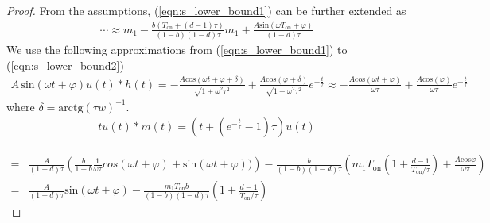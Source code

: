 \begin{proof}

From the assumptions, (\ref{eqn:s_lower_bound1}) can be further extended as
\begin{align}  \label{eqn:s_lower_bound2}
    \cdots \approx m_1 - \frac{b(T_{\text{on}} + (d-1)\tau)}{(1-b)(1-d)\tau} m_1 + \frac{A\text{sin}(\omega T_{\text{on}}+\varphi)}{(1-d)\tau}
\end{align}
We use the following approximations from (\ref{eqn:s_lower_bound1}) to (\ref{eqn:s_lower_bound2})
\begin{align}
    A \, \text{sin}(\omega  t+\varphi) u(t) * h(t) = -\frac{A \text{cos}(\omega t + \varphi + \delta)}{\sqrt{1+\omega^2\tau^2}} + \frac{A \text{cos}( \varphi + \delta)}{\sqrt{1+\omega^2\tau^2}} e^{-\frac{t}{\tau}} \approx -\frac{A \text{cos}(\omega t + \varphi)}{\omega\tau} + \frac{A \text{cos}( \varphi)}{\omega \tau} e^{-\frac{t}{\tau}}
\end{align}
where $\delta = \text{arctg}(\tau w)^{-1}$.
\begin{align}
    tu(t)*m(t) = \left(t + (e^{-\frac{t}{\tau}}-1)\tau \right) u(t)
\end{align}

\begin{align}
    =& \frac{A}{(1-d)\tau}\left( \frac{b}{1-b} \frac{1}{\omega \tau} cos(\omega t + \varphi) + \text{sin}(\omega t+\varphi))\right) -
    \frac{b}{(1-b)(1-d)\tau}\left( m_1T_{\text{on}} \left( 1 + \frac{d-1}{T_{\text{on}}/\tau}\right) + \frac{A \text{cos}\varphi}{\omega \tau}\right) \nonumber \\ 
    =&\frac{A}{(1-d)\tau}\text{sin}(\omega t+\varphi) - \frac{ m_1T_{\text{on}} b }{(1-b)(1-d)\tau} \left( 1 + \frac{d-1}{T_{\text{on}}/\tau}\right)
\end{align}


\end{proof}
